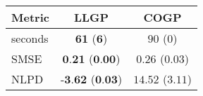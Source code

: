 \begin{tabular}{lcc}\toprule
Metric & LLGP & COGP\\
\midrule
seconds & $\textbf{61}$ ($\textbf{6}$) & $90$ ($0$)\\
SMSE & $\textbf{0.21}$ ($\textbf{0.00}$) & $0.26$ ($0.03$)\\
NLPD & $\textbf{-3.62}$ ($\textbf{0.03}$) & $14.52$ ($3.11$)\\

\bottomrule
\end{tabular}
